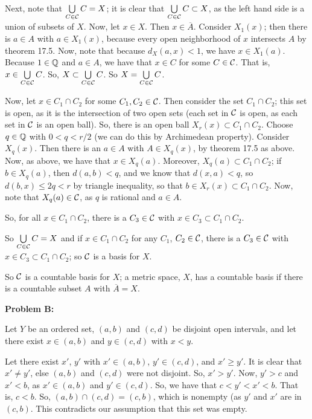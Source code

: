 \documentclass[a4paper,12pt]{article}
\begin{document}
Next, note that $\bigcup\limits_{C \in \mathcal{C}} C = X$; it is clear that $\bigcup\limits_{C \in \mathcal{C}} C \subset X$, as the left hand side is a union of subsets of $X$. Now, let $x \in X$. Then $x \in \overline{A}$. Consider $X_1(x)$; then there is $a \in A$ with $a \in X_1(x)$, because every open neighborhood of $x$ intersects $A$ by theorem 17.5. Now, note that because $d_X(a,x) < 1$, we have $x \in X_1(a)$. Because $1 \in \mathbb{Q}$ and $a \in A$, we have that $x \in C$ for some $C \in \mathcal{C}$. That is, $x \in \bigcup\limits_{C \in \mathcal{C}} C$. So, $X \subset  \bigcup\limits_{C \in \mathcal{C}} C$. So $X = \bigcup\limits_{C \in \mathcal{C}} C$.

Now, let $x \in C_1 \cap C_2$ for some $C_1, C_2 \in \mathcal{C}$. Then consider the set $C_1 \cap C_2$; this set is open, as it is the intersection of two open sets (each set in $\mathcal{C}$ is open, as each set in $\mathcal{C}$ is an open ball). So, there is an open ball $X_r(x) \subset C_1 \cap C_2$. Choose $q \in \mathbb{Q}$ with $0<q < r/2$ (we can do this by Archimedean property). Consider $X_{q}(x)$. Then there is an $a \in A$ with $A \in X_{q}(x)$, by theorem 17.5 as above. Now, as above, we have that $x \in X_q(a)$. Moreover, $X_q(a) \subset C_1 \cap C_2$; if $b \in X_q(a)$, then $d(a,b) < q$, and we know that $d(x,a) < q$, so $d(b,x) \leq 2q < r$ by triangle inequality, so that $b \in X_r(x) \subset C_1 \cap C_2$. Now, note that $X_q(a) \in \mathcal{C}$, as $q$ is rational and $a \in A$.

So, for all $x \in C_1 \cap C_2$, there is a $C_3 \in \mathcal{C}$ with $x \in C_3 \subset C_1 \cap C_2$. 

So $\bigcup\limits_{C \in \mathcal{C}} C = X$ and if $x \in C_1 \cap C_2$ for any $C_1$, $C_2 \in \mathcal{C}$, there is a $C_3 \in \mathcal{C}$ with $x \in C_3 \subset C_1 \cap C_2$; so $\mathcal{C}$ is a basis for $X$.

So $\mathcal{C}$ is a countable basis for $X$; a metric space, $X$, has a countable basis if there is a countable subset $A$ with $\overline{A} = X$.



\shunt

{\bf Problem B:}

Let $Y$ be an ordered set, $(a,b)$ and $(c,d)$ be disjoint open intervals, and let there exist $x \in (a,b)$ and $y \in (c,d)$ with $x<y$.

Let there exist $x'$, $y'$ with $x' \in (a,b)$, $y' \in (c,d)$, and $x' \geq y'$. It is clear that $x' \neq y'$, else $(a,b)$ and $(c,d)$ were not disjoint. So, $x' > y'$. Now, $y' > c$ and $x' < b$, as $x' \in (a,b)$ and $y' \in (c,d)$. So, we have that $c< y' < x' < b$. That is, $c < b$. So, $(a,b) \cap (c,d) = (c,b)$, which is nonempty (as $y'$ and $x'$ are in $(c,b)$. This contradicts our assumption that this set was empty.
\end{document}
